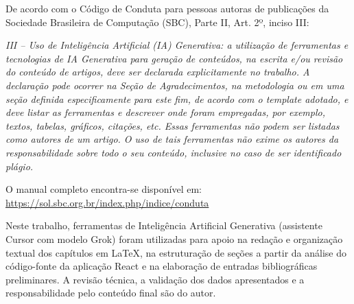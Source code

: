 \documentclass{bsimc}
\begin{document}
	\begin{IA-Generativa}{}

	De acordo com o Código de Conduta para pessoas autoras de publicações da Sociedade Brasileira de Computação (SBC), Parte II, Art. 2º, inciso III:

        \textit{III – Uso de Inteligência Artificial (IA) Generativa: a utilização de ferramentas e tecnologias de IA Generativa para geração de conteúdos, na escrita e/ou revisão do conteúdo de artigos, deve ser declarada explicitamente no trabalho. A declaração pode ocorrer na Seção de Agradecimentos, na metodologia ou em uma seção definida especificamente para este fim, de acordo com o template adotado, e deve listar as ferramentas e descrever onde foram empregadas, por exemplo, textos, tabelas, gráficos, citações, etc. Essas ferramentas não podem ser listadas como autores de um artigo. O uso de tais ferramentas não exime os autores da responsabilidade sobre todo o seu conteúdo, inclusive no caso de ser identificado plágio.}

       \noindent O manual completo encontra-se disponível em: \url{https://sol.sbc.org.br/index.php/indice/conduta}

       \vspace{1em}
       \noindent Neste trabalho, ferramentas de Inteligência Artificial Generativa (assistente Cursor com modelo Grok) foram utilizadas para apoio na redação e organização textual dos capítulos em \LaTeX{}, na estruturação de seções a partir da análise do código-fonte da aplicação React e na elaboração de entradas bibliográficas preliminares. A revisão técnica, a validação dos dados apresentados e a responsabilidade pelo conteúdo final são do autor.

	\end{IA-Generativa}

	\sumario

	\mainmatter


	


	
\end{document}
